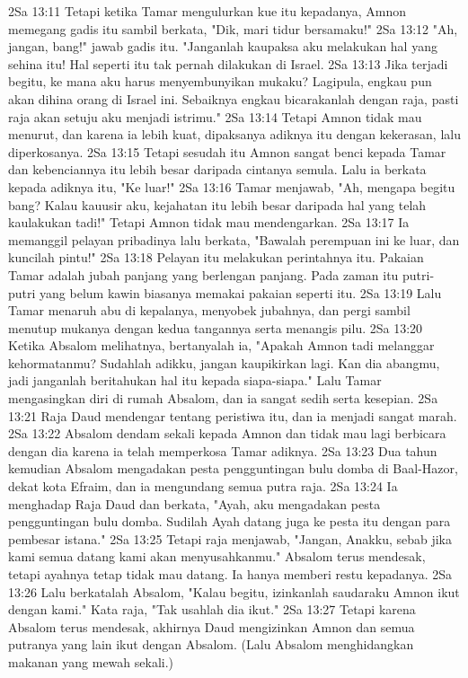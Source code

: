 2Sa 13:11  Tetapi ketika Tamar mengulurkan kue itu kepadanya, Amnon memegang gadis itu sambil berkata, "Dik, mari tidur bersamaku!"
2Sa 13:12  "Ah, jangan, bang!" jawab gadis itu. "Janganlah kaupaksa aku melakukan hal yang sehina itu! Hal seperti itu tak pernah dilakukan di Israel.
2Sa 13:13  Jika terjadi begitu, ke mana aku harus menyembunyikan mukaku? Lagipula, engkau pun akan dihina orang di Israel ini. Sebaiknya engkau bicarakanlah dengan raja, pasti raja akan setuju aku menjadi istrimu."
2Sa 13:14  Tetapi Amnon tidak mau menurut, dan karena ia lebih kuat, dipaksanya adiknya itu dengan kekerasan, lalu diperkosanya.
2Sa 13:15  Tetapi sesudah itu Amnon sangat benci kepada Tamar dan kebenciannya itu lebih besar daripada cintanya semula. Lalu ia berkata kepada adiknya itu, "Ke luar!"
2Sa 13:16  Tamar menjawab, "Ah, mengapa begitu bang? Kalau kauusir aku, kejahatan itu lebih besar daripada hal yang telah kaulakukan tadi!" Tetapi Amnon tidak mau mendengarkan.
2Sa 13:17  Ia memanggil pelayan pribadinya lalu berkata, "Bawalah perempuan ini ke luar, dan kuncilah pintu!"
2Sa 13:18  Pelayan itu melakukan perintahnya itu. Pakaian Tamar adalah jubah panjang yang berlengan panjang. Pada zaman itu putri-putri yang belum kawin biasanya memakai pakaian seperti itu.
2Sa 13:19  Lalu Tamar menaruh abu di kepalanya, menyobek jubahnya, dan pergi sambil menutup mukanya dengan kedua tangannya serta menangis pilu.
2Sa 13:20  Ketika Absalom melihatnya, bertanyalah ia, "Apakah Amnon tadi melanggar kehormatanmu? Sudahlah adikku, jangan kaupikirkan lagi. Kan dia abangmu, jadi janganlah beritahukan hal itu kepada siapa-siapa." Lalu Tamar mengasingkan diri di rumah Absalom, dan ia sangat sedih serta kesepian.
2Sa 13:21  Raja Daud mendengar tentang peristiwa itu, dan ia menjadi sangat marah.
2Sa 13:22  Absalom dendam sekali kepada Amnon dan tidak mau lagi berbicara dengan dia karena ia telah memperkosa Tamar adiknya.
2Sa 13:23  Dua tahun kemudian Absalom mengadakan pesta pengguntingan bulu domba di Baal-Hazor, dekat kota Efraim, dan ia mengundang semua putra raja.
2Sa 13:24  Ia menghadap Raja Daud dan berkata, "Ayah, aku mengadakan pesta pengguntingan bulu domba. Sudilah Ayah datang juga ke pesta itu dengan para pembesar istana."
2Sa 13:25  Tetapi raja menjawab, "Jangan, Anakku, sebab jika kami semua datang kami akan menyusahkanmu." Absalom terus mendesak, tetapi ayahnya tetap tidak mau datang. Ia hanya memberi restu kepadanya.
2Sa 13:26  Lalu berkatalah Absalom, "Kalau begitu, izinkanlah saudaraku Amnon ikut dengan kami." Kata raja, "Tak usahlah dia ikut."
2Sa 13:27  Tetapi karena Absalom terus mendesak, akhirnya Daud mengizinkan Amnon dan semua putranya yang lain ikut dengan Absalom. (Lalu Absalom menghidangkan makanan yang mewah sekali.)
